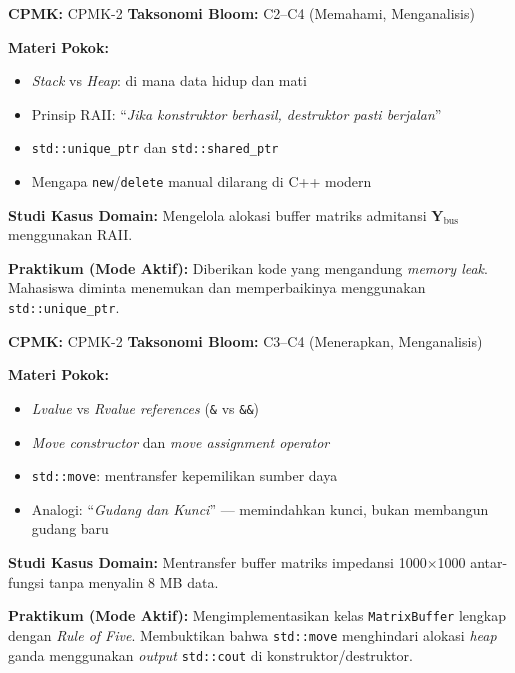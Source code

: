 \documentclass[12pt,a4paper]{article}
\begin{document}
\begin{tcolorbox}[colback=white, colframe=uniblue, title={\textbf{Minggu 3: Kepemilikan Memori \& RAII}}, fonttitle=\bfseries\color{white}, coltitle=white, colbacktitle=uniblue]
\textbf{CPMK:} CPMK-2 \hfill \textbf{Taksonomi Bloom:} C2--C4 (Memahami, Menganalisis)

\textbf{Materi Pokok:}
\begin{itemize}[nosep]
    \item \textit{Stack} vs \textit{Heap}: di mana data hidup dan mati
    \item Prinsip RAII: ``\textit{Jika konstruktor berhasil, destruktor pasti berjalan}''
    \item \texttt{std::unique\_ptr} dan \texttt{std::shared\_ptr}
    \item Mengapa \texttt{new}/\texttt{delete} manual dilarang di C++ modern
\end{itemize}

\textbf{Studi Kasus Domain:}
Mengelola alokasi buffer matriks admitansi $\mathbf{Y}_{\text{bus}}$ menggunakan RAII.

\textbf{Praktikum (Mode Aktif):}
Diberikan kode yang mengandung \textit{memory leak}. Mahasiswa diminta menemukan dan memperbaikinya menggunakan \texttt{std::unique\_ptr}.
\end{tcolorbox}

\begin{tcolorbox}[colback=white, colframe=uniblue, title={\textbf{Minggu 4: \textit{Move Semantics} --- Memindahkan, Bukan Menyalin}}, fonttitle=\bfseries\color{white}, coltitle=white, colbacktitle=uniblue]
\textbf{CPMK:} CPMK-2 \hfill \textbf{Taksonomi Bloom:} C3--C4 (Menerapkan, Menganalisis)

\textbf{Materi Pokok:}
\begin{itemize}[nosep]
    \item \textit{Lvalue} vs \textit{Rvalue references} (\texttt{\&} vs \texttt{\&\&})
    \item \textit{Move constructor} dan \textit{move assignment operator}
    \item \texttt{std::move}: mentransfer kepemilikan sumber daya
    \item Analogi: ``\textit{Gudang dan Kunci}'' --- memindahkan kunci, bukan membangun gudang baru
\end{itemize}

\textbf{Studi Kasus Domain:}
Mentransfer buffer matriks impedansi 1000$\times$1000 antar-fungsi tanpa menyalin 8 MB data.

\textbf{Praktikum (Mode Aktif):}
Mengimplementasikan kelas \texttt{MatrixBuffer} lengkap dengan \textit{Rule of Five}. Membuktikan bahwa \texttt{std::move} menghindari alokasi \textit{heap} ganda menggunakan \textit{output} \texttt{std::cout} di konstruktor/destruktor.
\end{tcolorbox}
\end{document}
